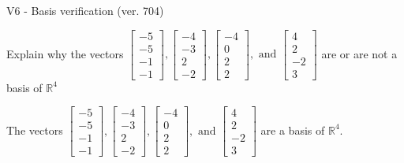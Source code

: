 \begin{exercise}
  \begin{exerciseTitle}V6 - Basis verification (ver. 704)\end{exerciseTitle}
  \begin{exerciseStatement}
    Explain why the vectors \(\left[\begin{array}{r}
-5 \\
-5 \\
-1 \\
-1
\end{array}\right] , \left[\begin{array}{r}
-4 \\
-3 \\
2 \\
-2
\end{array}\right] , \left[\begin{array}{r}
-4 \\
0 \\
2 \\
2
\end{array}\right] , \text{ and } \left[\begin{array}{r}
4 \\
2 \\
-2 \\
3
\end{array}\right]\) are or are not a basis of \(\mathbb{R}^4\)	


  \end{exerciseStatement}
  \begin{exerciseAnswer}
   The vectors \(\left[\begin{array}{r}
-5 \\
-5 \\
-1 \\
-1
\end{array}\right] , \left[\begin{array}{r}
-4 \\
-3 \\
2 \\
-2
\end{array}\right] , \left[\begin{array}{r}
-4 \\
0 \\
2 \\
2
\end{array}\right] , \text{ and } \left[\begin{array}{r}
4 \\
2 \\
-2 \\
3
\end{array}\right]\) 
  	 are  a basis of \(\mathbb{R}^4\).
  


  \end{exerciseAnswer}
\end{exercise}